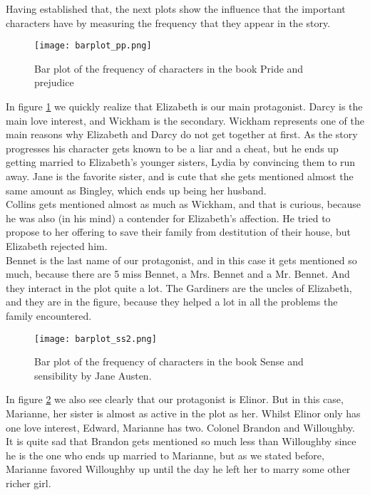 \documentclass{article}
\begin{document}
Having established that, the next plots show the influence that the important characters have by measuring the frequency that they appear in the story. \\



\begin{figure}[htp]
	\centering
	\texttt{[image: barplot\_pp.png]}
	\caption{Bar plot of the frequency of characters in the book Pride and prejudice}\label{fig4}
\end{figure}

In figure \ref{fig4} we quickly realize that Elizabeth is our main protagonist. Darcy is the main love interest, and Wickham is the secondary. Wickham represents one of the main reasons why Elizabeth and Darcy do not get together at first. As the story progresses his character gets known to be a liar and a cheat, but he ends up getting married to Elizabeth's younger sisters, Lydia by convincing them to run away. Jane is the favorite sister, and is cute that she gets mentioned almost the same amount as Bingley, which ends up being her husband. \\

Collins gets mentioned almost as much as Wickham, and that is curious, because he was also (in his mind) a contender for Elizabeth's affection. He tried to propose to her offering to save their family from destitution of their house, but Elizabeth rejected him.\\

Bennet is the last name of our protagonist, and in this case it gets mentioned so much, because there are 5 miss Bennet, a Mrs. Bennet and a Mr. Bennet. And they interact in the plot quite a lot. The Gardiners are the uncles of Elizabeth, and they are in the figure, because they helped a lot in all the problems the family encountered.\\

\begin{figure}[htp]
	\centering
	\texttt{[image: barplot\_ss2.png]}
	\caption{Bar plot of the frequency of characters in the book Sense and sensibility by Jane Austen.}\label{fig5}
\end{figure}

In figure \ref{fig5} we also see clearly that our protagonist is Elinor. But in this case, Marianne, her sister is almost as active in the plot as her. Whilst Elinor only has one love interest, Edward, Marianne has two. Colonel Brandon and Willoughby. It is quite sad that Brandon gets mentioned so much less than Willoughby since he is the one who ends up married to Marianne, but as we stated before, Marianne favored Willoughby up until the day he left her to marry some other richer girl. \\
\end{document}
